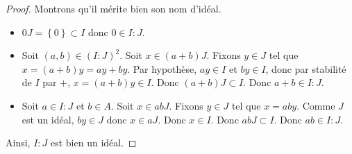 \documentclass[french]{book}
\theoremstyle{plain}
\theoremstyle{definition}
\theoremstyle{remark}
\begin{document}
\begin{proof}
	Montrons qu'il mérite bien son nom d'idéal.
	\begin{itemize}
		\item $0J=\left\{0\right\}\subset  I$ donc $0\in I:J$.
		\item Soit $(a,b)\in\left(I:J\right)^2$. Soit $x\in(a+b)J$. Fixons $y\in J$ tel que $x=(a+b)y=ay+by$. Par hypothèse, $ay\in I$ et $by\in I$, donc par stabilité de $I$ par $+$, $x=(a+b)y\in I$. Donc $(a+b)J\subset I$. Donc $a+b\in I:J$.
		\item Soit $a\in I:J$ et $b\in A$. Soit $x\in abJ$. Fixons $y\in J$ tel que $x=aby$. Comme $J$ est un idéal, $by\in J$ donc $x\in aJ$. Donc $x\in I$. Donc $abJ\subset I$. Donc $ab\in I:J$.
	\end{itemize}
	Ainsi, $I:J$ est bien un idéal.
\end{proof}
\end{document}
